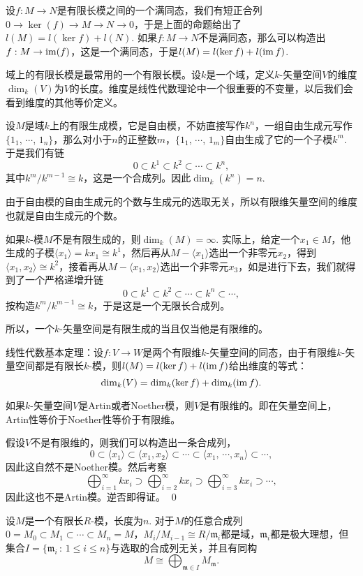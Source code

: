 设$f:M\to N$是有限长模之间的一个满同态，我们有短正合列$0\to \ker(f)\to M\to N\to 0$，于是上面的命题给出了$l(M)=l(\ker f)+l(N)$. 如果$f:M\to N$不是满同态，那么可以构造出$f:M\to \operatorname{im}(f)$，这是一个满同态，于是$l(M)=l(\ker f)+l(\operatorname{im} f)$. 

\para 域上的有限长模是最常用的一个有限长模。设$k$是一个域，定义$k$-矢量空间$V$的维度$\dim_k(V)$为$V$的长度。维度是线性代数理论中一个很重要的不变量，以后我们会看到维度的其他等价定义。

设$M$是域$k$上的有限生成模，它是自由模，不妨直接写作$k^n$，一组自由生成元写作$\{1_1$, $\cdots$, $1_n\}$，那么对小于$n$的正整数$m$，$\{1_1$, $\cdots$, $1_m\}$自由生成了它的一个子模$k^m$. 于是我们有链
\[
	0\subset k^1\subset  k^2 \subset \cdots \subset k^n,
\]
其中$k^m/k^{m-1}\cong k$，这是一个合成列。因此$\dim_k(k^n)=n$. 

由于自由模的自由生成元的个数与生成元的选取无关，所以有限维矢量空间的维度也就是自由生成元的个数。

如果$k$-模$M$不是有限生成的，则$\dim_k(M)=\infty$. 实际上，给定一个$x_1\in M$，他生成的子模$\langle x_1\rangle=kx_1\cong k^1$，然后再从$M-\langle x_1\rangle$选出一个非零元$x_2$，得到$\langle x_1,x_2\rangle\cong k^2$，接着再从$M-\langle x_1,x_2\rangle$选出一个非零元$x_3$，如是进行下去，我们就得到了一个严格递增升链
\[
	0\subset k^1\subset k^2\subset \cdots \subset k^n\subset \cdots,
\]
按构造$k^m/k^{m-1}\cong k$，于是这是一个无限长合成列。

所以，一个$k$-矢量空间是有限生成的当且仅当他是有限维的。

\pro 线性代数基本定理：设$f:V\to W$是两个有限维$k$-矢量空间的同态，由于有限维$k$-矢量空间都是有限长$k$-模，则$l(M)=l(\ker f)+l(\operatorname{im} f)$给出维度的等式：
\[
	\dim_k(V)=\dim_k(\ker f)+\dim_k(\operatorname{im} f).
\]

\pro 如果$k$-矢量空间$V$是Artin或者Noether模，则$V$是有限维的。即在矢量空间上，Artin性等价于Noether性等价于有限维。

\proof
	假设$V$不是有限维的，则我们可以构造出一条合成列，
	\[
	0\subset \langle x_1\rangle\subset \langle x_1,x_2\rangle\subset \cdots \subset \langle x_1,\,\cdots\!,x_n\rangle\subset \cdots,
	\]
	因此这自然不是Noether模。然后考察
	\[
		\bigoplus_{i=1}^\infty kx_i \supset \bigoplus_{i=2}^\infty kx_i \supset \bigoplus_{i=3}^\infty kx_i\supset \cdots,
	\]
	因此这也不是Artin模。逆否即得证。
\qed


\theo 设$M$是一个有限长$R$-模，长度为$n$. 对于$M$的任意合成列$0=M_0\subset M_1\subset \cdots\subset M_n=M$，$M_i/M_{i-1}\cong R/\mathfrak{m}_i$都是域，$\mathfrak{m}_i$都是极大理想，但集合$I=\{\mathfrak{m}_i\,:\,1\leq i\leq n\}$与选取的合成列无关，并且有同构
\[
	M\cong \bigoplus_{\mathfrak{m}\in I} M_\mathfrak{m}.
\]

